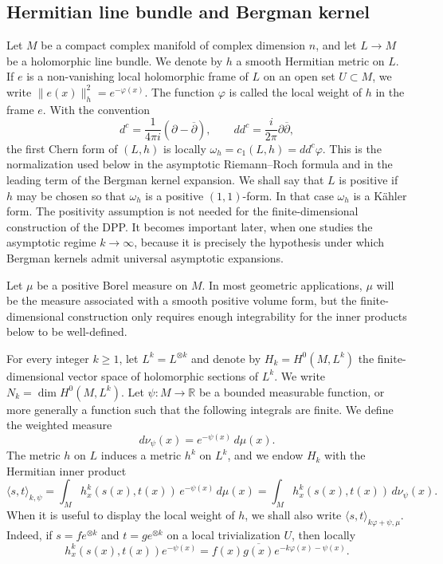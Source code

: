 \documentclass[12pt,a4paper,reqno]{article}
\theoremstyle{thmstyleone}
\theoremstyle{thmstylethree}
\theoremstyle{thmstyletwo}
\numberwithin{equation}{subsection}
\def\geq{\geqslant}
\begin{document}
\subsection{Hermitian line bundle and Bergman kernel}

Let $M$ be a compact complex manifold of complex dimension $n$, and let $L\longrightarrow M$ be a holomorphic line bundle. We denote by $h$ a smooth Hermitian metric on $L$. If $e$ is a non-vanishing local holomorphic frame of $L$ on an open set $U\subset M$, we write $\|e(x)\|_h^2=e^{-\varphi(x)}.$ The function $\varphi$ is called the local weight of $h$ in the frame $e$. With the convention
\[
    d^c=\frac{1}{4\pi i}(\partial-\overline{\partial}),
    \qquad
    dd^c=\frac{i}{2\pi}\partial\overline{\partial},
\]
the first Chern form of $(L,h)$ is locally $\omega_h=c_1(L,h)=dd^c\varphi.$ This is the normalization used below in the asymptotic Riemann--Roch formula and in the leading term of the Bergman kernel expansion. We shall say that $L$ is positive if $h$ may be chosen so that $\omega_h$ is a positive $(1,1)$-form. In that case $\omega_h$ is a K\"ahler form. The positivity assumption is not needed for the finite-dimensional construction of the DPP. It becomes important later, when one studies the asymptotic regime $k\to\infty$, because it is precisely the hypothesis under which Bergman kernels admit universal asymptotic expansions.

Let $\mu$ be a positive Borel measure on $M$. In most geometric applications, $\mu$ will be the measure associated with a smooth positive volume form, but the finite-dimensional construction only requires enough integrability for the inner products below to be well-defined.

For every integer $k\geq 1$, let $L^k=L^{\otimes k}$
and denote by $H_k=H^0(M,L^k)$ the finite-dimensional vector space of holomorphic sections of $L^k$.
We write $N_k=\dim H^0(M,L^k).$ Let $\psi:M\to\mathbb R$ be a bounded measurable function, or more generally a function such that the following integrals are finite. We define the weighted measure
\[
    d\nu_\psi(x)=e^{-\psi(x)}\,d\mu(x).
\]
The metric $h$ on $L$ induces a metric $h^k$ on $L^k$, and we endow $H_k$ with the Hermitian inner product
\[
    \langle s,t\rangle_{k,\psi}
    =
    \int_M h_x^k(s(x),t(x))\,e^{-\psi(x)}\,d\mu(x)
    =
    \int_M h_x^k(s(x),t(x))\,d\nu_\psi(x).
\]
When it is useful to display the local weight of $h$, we shall also write $\langle s,t\rangle_{k\varphi+\psi,\mu}.$ Indeed, if $s=f e^{\otimes k}$ and $t=g e^{\otimes k}$ on a local
trivialization $U$, then locally
\[
    h_x^k(s(x),t(x))e^{-\psi(x)}
    =
    f(x)\overline{g(x)}e^{-k\varphi(x)-\psi(x)}.
\]
\end{document}
